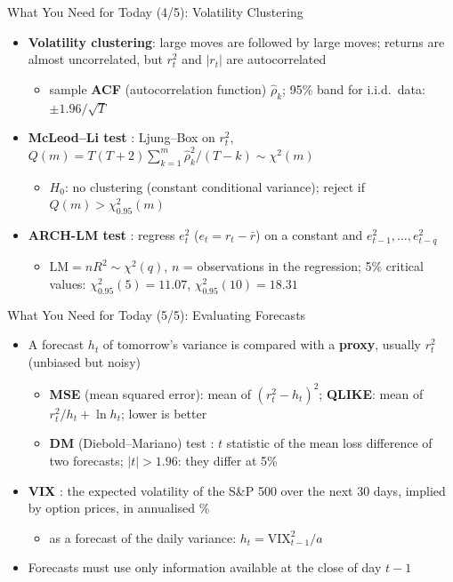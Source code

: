 \begin{frame}{What You Need for Today (4/5): Volatility Clustering}
\itemsize{\small}
\begin{itemize}
    \item \textbf{Volatility clustering}: large moves are followed by large moves; returns are almost uncorrelated, but $r_t^2$ and $|r_t|$ are autocorrelated
    \begin{itemize}
        \item sample \textbf{ACF} (autocorrelation function) $\hat\rho_k$; 95\% band for i.i.d.\ data: $\pm 1.96/\sqrt{T}$
    \end{itemize}
    \item \textbf{McLeod--Li test} : Ljung--Box  on $r_t^2$, $Q(m) = T(T+2)\sum_{k=1}^m \hat\rho_k^2/(T-k) \sim \chi^2(m)$
    \begin{itemize}
        \item $H_0$: no clustering (constant conditional variance); reject if $Q(m) > \chi^2_{0.95}(m)$
    \end{itemize}
    \item \textbf{ARCH-LM test} : regress $e_t^2$ ($e_t = r_t - \bar r$) on a constant and $e_{t-1}^2, \dots, e_{t-q}^2$
    \begin{itemize}
        \item $\mathrm{LM} = nR^2 \sim \chi^2(q)$, $n$ = observations in the regression; 5\% critical values: $\chi^2_{0.95}(5) = 11.07$, $\chi^2_{0.95}(10) = 18.31$
    \end{itemize}
\end{itemize}
\end{frame}

\begin{frame}{What You Need for Today (5/5): Evaluating Forecasts}
\itemsize{\small}
\begin{itemize}
    \item A forecast $h_t$ of tomorrow's variance is compared with a \textbf{proxy}, usually $r_t^2$ (unbiased but noisy)
    \begin{itemize}
        \item \textbf{MSE} (mean squared error): mean of $(r_t^2 - h_t)^2$; \textbf{QLIKE}: mean of $r_t^2/h_t + \ln h_t$; lower is better 
        \item \textbf{DM} (Diebold--Mariano) test : $t$ statistic of the mean loss difference of two forecasts; $|t| > 1.96$: they differ at 5\%
    \end{itemize}
    \item \textbf{VIX} : the expected volatility of the S\&P 500 over the next 30 days, implied by option prices, in annualised \%
    \begin{itemize}
        \item as a forecast of the daily variance: $h_t = \mathrm{VIX}_{t-1}^2/a$
    \end{itemize}
    \item Forecasts must use only information available at the close of day $t-1$
\end{itemize}
\end{frame}


